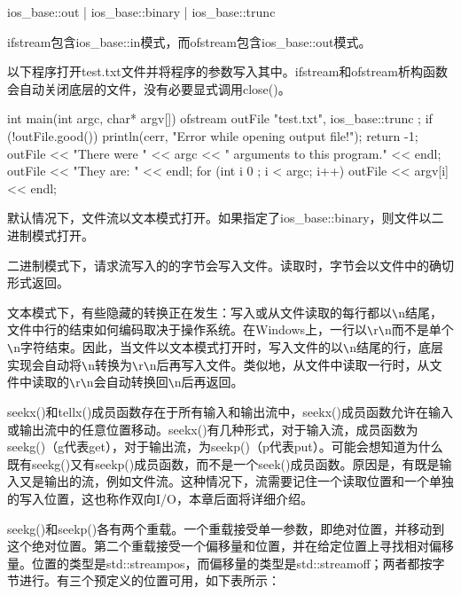 \begin{cpp}
ios_base::out | ios_base::binary | ios_base::trunc
\end{cpp}

ifstream包含ios\_base::in模式，而ofstream包含ios\_base::out模式。

以下程序打开test.txt文件并将程序的参数写入其中。ifstream和ofstream析构函数会自动关闭底层的文件，没有必要显式调用close()。


\begin{cpp}
int main(int argc, char* argv[])
{
    ofstream outFile { "test.txt", ios_base::trunc };
    if (!outFile.good()) {
        println(cerr, "Error while opening output file!");
        return -1;
    }
    outFile << "There were " << argc << " arguments to this program." << endl;
    outFile << "They are: " << endl;
    for (int i { 0 }; i < argc; i++) {
        outFile << argv[i] << endl;
    }
}
\end{cpp}


默认情况下，文件流以文本模式打开。如果指定了ios\_base::binary，则文件以二进制模式打开。

二进制模式下，请求流写入的的字节会写入文件。读取时，字节会以文件中的确切形式返回。

文本模式下，有些隐藏的转换正在发生：写入或从文件读取的每行都以\verb|\|n结尾，文件中行的结束如何编码取决于操作系统。在Windows上，一行以\verb|\|r\verb|\|n而不是单个\verb|\|n字符结束。因此，当文件以文本模式打开时，写入文件的以\verb|\|n结尾的行，底层实现会自动将\verb|\|n转换为\verb|\|r\verb|\|n后再写入文件。类似地，从文件中读取一行时，从文件中读取的\verb|\|r\verb|\|n会自动转换回\verb|\|n后再返回。


seekx()和tellx()成员函数存在于所有输入和输出流中，seekx()成员函数允许在输入或输出流中的任意位置移动。seekx()有几种形式，对于输入流，成员函数为seekg()（g代表get），对于输出流，为seekp()（p代表put）。可能会想知道为什么既有seekg()又有seekp()成员函数，而不是一个seek()成员函数。原因是，有既是输入又是输出的流，例如文件流。这种情况下，流需要记住一个读取位置和一个单独的写入位置，这也称作双向I/O，本章后面将详细介绍。

seekg()和seekp()各有两个重载。一个重载接受单一参数，即绝对位置，并移动到这个绝对位置。第二个重载接受一个偏移量和位置，并在给定位置上寻找相对偏移量。位置的类型是std::streampos，而偏移量的类型是std::streamoff；两者都按字节进行。有三个预定义的位置可用，如下表所示：

